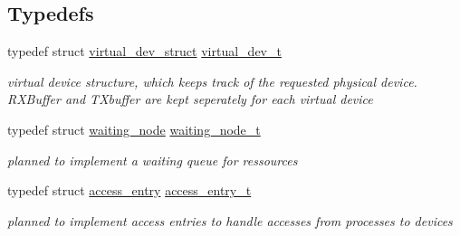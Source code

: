 \subsection*{Typedefs}
\begin{CompactItemize}
\item 
\hypertarget{group___r_e_s_o_u_r_c_e___m_g0a6d9ff2e6e8e956cd95db8b5364fd3b}{
typedef struct \hyperlink{structvirtual__dev__struct}{virtual\_\-dev\_\-struct} \hyperlink{group___r_e_s_o_u_r_c_e___m_g0a6d9ff2e6e8e956cd95db8b5364fd3b}{virtual\_\-dev\_\-t}}
\label{group___r_e_s_o_u_r_c_e___m_g0a6d9ff2e6e8e956cd95db8b5364fd3b}

\begin{CompactList}\small\item\em virtual device structure, which keeps track of the requested physical device. RXBuffer and TXbuffer are kept seperately for each virtual device \item\end{CompactList}\item 
\hypertarget{group___r_e_s_o_u_r_c_e___m_g276d8f250d49d20c964bac614730a049}{
typedef struct \hyperlink{structwaiting__node}{waiting\_\-node} \hyperlink{group___r_e_s_o_u_r_c_e___m_g276d8f250d49d20c964bac614730a049}{waiting\_\-node\_\-t}}
\label{group___r_e_s_o_u_r_c_e___m_g276d8f250d49d20c964bac614730a049}

\begin{CompactList}\small\item\em planned to implement a waiting queue for ressources \item\end{CompactList}\item 
\hypertarget{group___r_e_s_o_u_r_c_e___m_gb728d76414e2f7fa8ad09a84c6547dc9}{
typedef struct \hyperlink{structaccess__entry}{access\_\-entry} \hyperlink{group___r_e_s_o_u_r_c_e___m_gb728d76414e2f7fa8ad09a84c6547dc9}{access\_\-entry\_\-t}}
\label{group___r_e_s_o_u_r_c_e___m_gb728d76414e2f7fa8ad09a84c6547dc9}

\begin{CompactList}\small\item\em planned to implement access entries to handle accesses from processes to devices \item\end{CompactList}\end{CompactItemize}
